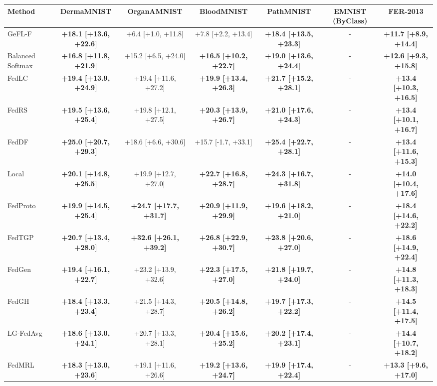 \begin{tabular}{lcccccc}
\toprule
Method & DermaMNIST & OrganAMNIST & BloodMNIST & PathMNIST & EMNIST (ByClass) & FER-2013\\
\midrule
GeFL-F & \textbf{+18.1 [+13.6, +22.6]} & +6.4 [+1.0, +11.8] & +7.8 [+2.2, +13.4] & \textbf{+18.4 [+13.5, +23.3]} & - & \textbf{+11.7 [+8.9, +14.4]}\\
Balanced Softmax & \textbf{+16.8 [+11.8, +21.9]} & +15.2 [+6.5, +24.0] & \textbf{+16.5 [+10.2, +22.7]} & \textbf{+19.0 [+13.6, +24.4]} & - & \textbf{+12.6 [+9.3, +15.8]}\\
FedLC & \textbf{+19.4 [+13.9, +24.9]} & +19.4 [+11.6, +27.2] & \textbf{+19.9 [+13.4, +26.3]} & \textbf{+21.7 [+15.2, +28.1]} & - & \textbf{+13.4 [+10.3, +16.5]}\\
FedRS & \textbf{+19.5 [+13.6, +25.4]} & +19.8 [+12.1, +27.5] & \textbf{+20.3 [+13.9, +26.7]} & \textbf{+21.0 [+17.6, +24.3]} & - & \textbf{+13.4 [+10.1, +16.7]}\\
FedDF & \textbf{+25.0 [+20.7, +29.3]} & +18.6 [+6.6, +30.6] & +15.7 [-1.7, +33.1] & \textbf{+25.4 [+22.7, +28.1]} & - & \textbf{+13.4 [+11.6, +15.3]}\\
Local & \textbf{+20.1 [+14.8, +25.5]} & +19.9 [+12.7, +27.0] & \textbf{+22.7 [+16.8, +28.7]} & \textbf{+24.3 [+16.7, +31.8]} & - & \textbf{+14.0 [+10.4, +17.6]}\\
FedProto & \textbf{+19.9 [+14.5, +25.4]} & \textbf{+24.7 [+17.7, +31.7]} & \textbf{+20.9 [+11.9, +29.9]} & \textbf{+19.6 [+18.2, +21.0]} & - & \textbf{+18.4 [+14.6, +22.2]}\\
FedTGP & \textbf{+20.7 [+13.4, +28.0]} & \textbf{+32.6 [+26.1, +39.2]} & \textbf{+26.8 [+22.9, +30.7]} & \textbf{+23.8 [+20.6, +27.0]} & - & \textbf{+18.6 [+14.9, +22.4]}\\
FedGen & \textbf{+19.4 [+16.1, +22.7]} & +23.2 [+13.9, +32.6] & \textbf{+22.3 [+17.5, +27.0]} & \textbf{+21.8 [+19.7, +24.0]} & - & \textbf{+14.8 [+11.3, +18.3]}\\
FedGH & \textbf{+18.4 [+13.3, +23.4]} & +21.5 [+14.3, +28.7] & \textbf{+20.5 [+14.8, +26.2]} & \textbf{+19.7 [+17.3, +22.2]} & - & \textbf{+14.5 [+11.4, +17.5]}\\
LG-FedAvg & \textbf{+18.6 [+13.0, +24.1]} & +20.7 [+13.3, +28.1] & \textbf{+20.4 [+15.6, +25.2]} & \textbf{+20.2 [+17.4, +23.1]} & - & \textbf{+14.4 [+10.7, +18.2]}\\
FedMRL & \textbf{+18.3 [+13.0, +23.6]} & +19.1 [+11.6, +26.6] & \textbf{+19.2 [+13.6, +24.7]} & \textbf{+19.9 [+17.4, +22.4]} & - & \textbf{+13.3 [+9.6, +17.0]}\\
\bottomrule
\end{tabular}
